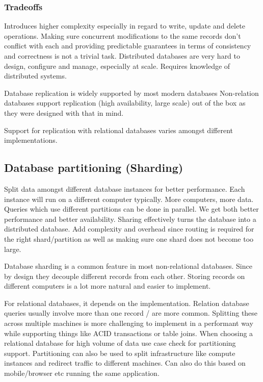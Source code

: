 \subsubsection{Tradeoffs}
Introduces higher complexity especially in regard to write, update and delete operations.
Making sure concurrent modifications to the same records don't conflict with each and providing predictable guarantees in terms of consistency and correctness is not a trivial task.
Distributed databases are very hard to design, configure and manage, especially at scale.
Requires knowledge of distributed systems.

Database replication is widely supported by most modern databases
Non-relation databases support replication (high availability, large scale) out of the box as they were designed with that in mind.

Support for replication with relational databases varies amongst different implementations.

\subsection{Database partitioning (Sharding)}
Split data amongst different database instances for better performance.
Each instance will run on a different computer typically.
More computers, more data.
Queries which use different partitions can be done in parallel.
We get both better performance and better availability.
Sharing effectively turns the database into a distributed database.
Add complexity and overhead since routing is required for the right shard/partition as well as making sure one shard does not become too large.

Database sharding is a common feature in most non-relational databases.
Since by design they decouple different records from each other.
Storing records on different computers is a lot more natural and easier to implement.

For relational databases, it depends on the implementation.
Relation database queries usually involve more than one record / are more common.
Splitting these across multiple machines is more challenging to implement in a performant way while supporting things like ACID transactions or table joins.
When choosing a relational database for high volume of data use case check for partitioning support.
Partitioning can also be used to split infrastructure like compute instances and redirect traffic to different machines.
Can also do this based on mobile/browser etc running the same application.

